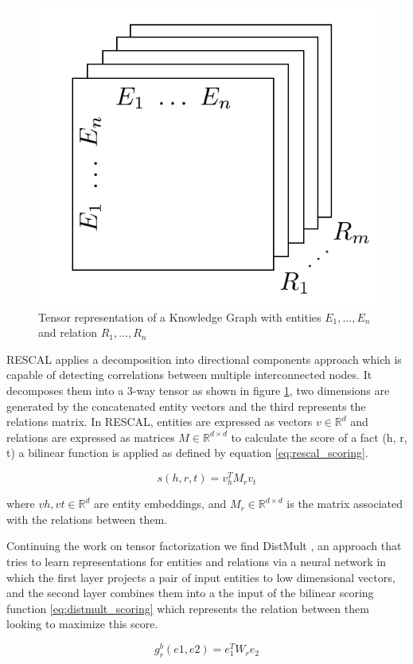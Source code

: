 \begin{figure}[!htp]
    \centering
    \includegraphics[width=.45\textwidth]{fig/embeddings/Rescal.png}
    \caption{Tensor representation of a Knowledge Graph with entities $E_1,...,E_n$ and relation $R_1,...,R_n$}
    \label{fig:emb-rescal}
\end{figure}

RESCAL applies a decomposition into directional components approach which is capable of detecting correlations between multiple interconnected nodes. It decomposes them into a 3-way tensor as shown in figure \ref{fig:emb-rescal}, two dimensions are generated by the concatenated entity vectors and the third represents the relations matrix.
In RESCAL, entities are expressed as vectors $v \in \mathbb{R}^d$ and relations are expressed as matrices $M \in \mathbb{R}^{d \times d}$  to calculate the score of a fact (h, r, t) a bilinear function is applied as defined by equation \ref{eq:rescal_scoring}.

\begin{equation}
    \label{eq:rescal_scoring}
    s(h, r, t) = v^T_h M_r v_t
\end{equation}

where $vh, vt \in \mathbb{R}^d$ are entity embeddings, and $M_r \in \mathbb{R}^{d\times d}$ is the matrix associated with the relations between them.

Continuing the work on tensor factorization we find DistMult \cite{}, an approach that tries to learn representations for entities and relations via a neural network in which the first layer projects a pair of input entities to low dimensional vectors, and the second layer combines them into a the input of the bilinear scoring function \ref{eq:distmult_scoring} which represents the relation between them looking to maximize this score.

\begin{equation}
    \label{eq:distmult_scoring}
    g^b_r (e1, e2) = e_1^T W_r e_2
\end{equation}

